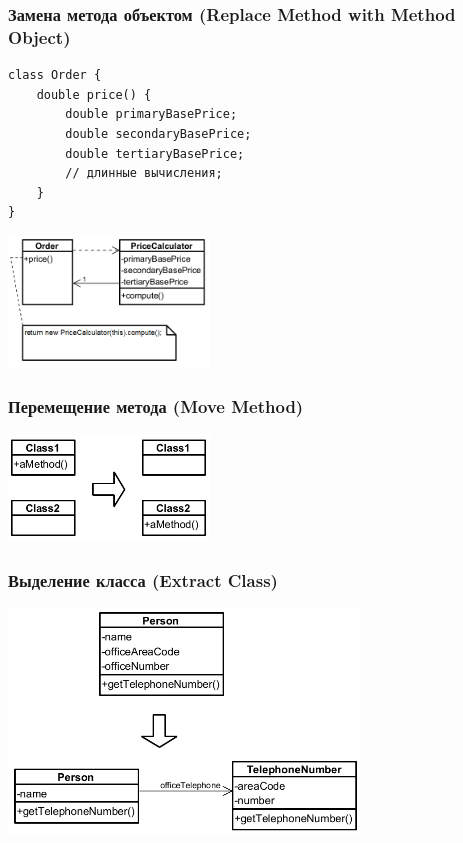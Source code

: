 \documentclass{../../slides-style}
\begin{document}
    \begin{frame}[fragile]
        \frametitle{Замена метода объектом (Replace Method with Method Object)}
        \begin{footnotesize}
            \begin{verbatim}
class Order {
    double price() {
        double primaryBasePrice;
        double secondaryBasePrice;
        double tertiaryBasePrice;
        // длинные вычисления;
    }
}
            \end{verbatim}
        \end{footnotesize}
        
        \hspace{5cm}{\huge{$\Downarrow$}}
        
        \begin{center}
            \includegraphics[width=0.4\textwidth]{methodToObject.png}
        \end{center}
    \end{frame}

    \begin{frame}
        \frametitle{Перемещение метода (Move Method)}
        \begin{center}
            \includegraphics[width=0.4\textwidth]{moveMethod.png}
        \end{center}
    \end{frame}

    \begin{frame}
        \frametitle{Выделение класса (Extract Class)}
        \begin{center}
            \includegraphics[width=0.7\textwidth]{extractClass.png}
        \end{center}
    \end{frame}
\end{document}
